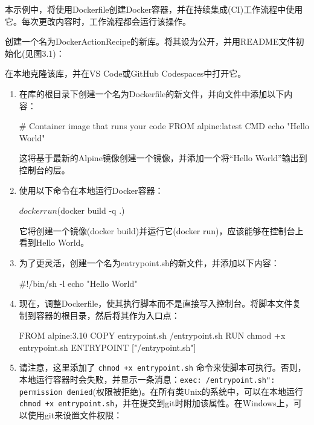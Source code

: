 
本示例中，将使用Dockerfile创建Docker容器，并在持续集成(CI)工作流程中使用它。每次更改内容时，工作流程都会运行该操作。


创建一个名为DockerActionRecipe的新库。将其设为公开，并用README文件初始化(见图3.1)：


在本地克隆该库，并在VS Code或GitHub Codespaces中打开它。


\begin{enumerate}
\item 
在库的根目录下创建一个名为Dockerfile的新文件，并向文件中添加以下内容：

\begin{shell}
# Container image that runs your code
FROM alpine:latest
CMD echo "Hello World"
\end{shell}

这将基于最新的Alpine镜像创建一个镜像，并添加一个将“Hello World”输出到控制台的层。

\item 
使用以下命令在本地运行Docker容器：

\begin{shell}
$ docker run $(docker build -q .)
\end{shell}

它将创建一个镜像(docker build)并运行它(docker run)，应该能够在控制台上看到Hello World。

\item 
为了更灵活，创建一个名为entrypoint.sh的新文件，并添加以下内容：

\begin{shell}
#!/bin/sh -l
echo "Hello World"
\end{shell}

\item 
现在，调整Dockerfile，使其执行脚本而不是直接写入控制台。将脚本文件复制到容器的根目录，然后将其作为入口点：

\begin{shell}
FROM alpine:3.10
COPY entrypoint.sh /entrypoint.sh
RUN chmod +x entrypoint.sh
ENTRYPOINT ["/entrypoint.sh"]
\end{shell}

\item 
请注意，这里添加了 \verb|chmod +x entrypoint.sh| 命令来使脚本可执行。否则，本地运行容器时会失败，并显示一条消息：\verb|exec: /entrypoint.sh": permission denied|(权限被拒绝)。在所有类Unix的系统中，可以在本地运行 \verb|chmod +x entrypoint.sh|，并在提交到git时附加该属性。在Windows上，可以使用git来设置文件权限：


\end{enumerate}
